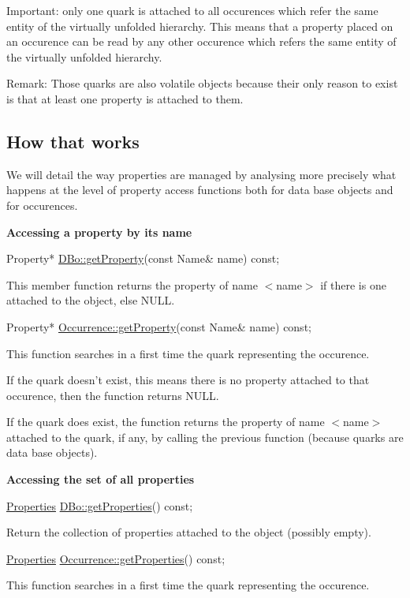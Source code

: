 \begin{DoxyParagraph}{Important\-:}
only one quark is attached to all occurences which refer the same entity of the virtually unfolded hierarchy. This means that a property placed on an occurence can be read by any other occurence which refers the same entity of the virtually unfolded hierarchy.
\end{DoxyParagraph}
\begin{DoxyParagraph}{Remark\-:}
Those quarks are also volatile objects because their only reason to exist is that at least one property is attached to them.
\end{DoxyParagraph}
\hypertarget{classHurricane_1_1Property_secPropertyHowThatWorks}{}\subsection{How that works}\label{classHurricane_1_1Property_secPropertyHowThatWorks}
We will detail the way properties are managed by analysing more precisely what happens at the level of property access functions both for data base objects and for occurences.

{\bfseries Accessing a property by its name} 
\begin{DoxyCode}
Property* \hyperlink{classHurricane_1_1DBo_a0026da8391fae433ce069c2ba6455fe8}{DBo::getProperty}(\textcolor{keyword}{const} Name& name) \textcolor{keyword}{const};
\end{DoxyCode}
 This member function returns the property of name {\ttfamily $<$name$>$} if there is one attached to the object, else N\-U\-L\-L. 
\begin{DoxyCode}
Property* \hyperlink{classHurricane_1_1Occurrence_a3e8c1bca059393ee3ba319850d96e416}{Occurrence::getProperty}(\textcolor{keyword}{const} Name& name) \textcolor{keyword}{const};
\end{DoxyCode}
 This function searches in a first time the quark representing the occurence.

If the quark doesn't exist, this means there is no property attached to that occurence, then the function returns N\-U\-L\-L.

If the quark does exist, the function returns the property of name {\ttfamily $<$name$>$} attached to the quark, if any, by calling the previous function (because quarks are data base objects).

{\bfseries Accessing the set of all properties} 
\begin{DoxyCode}
\hyperlink{namespaceHurricane_afd7bca6dad4be54b7c03b0463e6c0004}{Properties}  \hyperlink{classHurricane_1_1DBo_acafb68a90cdddb0921e742f3bab3da6b}{DBo::getProperties}() \textcolor{keyword}{const};
\end{DoxyCode}
 Return the collection of properties attached to the object (possibly empty). 
\begin{DoxyCode}
\hyperlink{namespaceHurricane_afd7bca6dad4be54b7c03b0463e6c0004}{Properties}  \hyperlink{classHurricane_1_1Occurrence_acec4179d4ec2718570f17462aa0beb70}{Occurrence::getProperties}() \textcolor{keyword}{const};
\end{DoxyCode}
 This function searches in a first time the quark representing the occurence.

